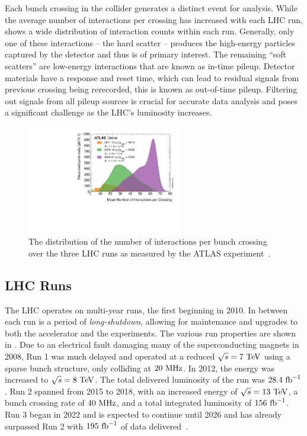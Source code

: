 Each bunch crossing in the collider generates a distinct event for analysis.
While the average number of interactions per crossing has increased with each LHC run,  shows a wide distribution of interaction counts within each run.
Generally, only one of these interactions -- the hard scatter -- produces the high-energy particles captured by the detector and thus is of primary interest.
The remaining ``soft scatters'' are low-energy interactions that are known as in-time pileup.
Detector materials have a response and reset time, which can lead to residual signals from previous crossing being rerecorded, this is known as out-of-time pileup.
Filtering out signals from all pileup sources is crucial for accurate data analysis and poses a significant challenge as the LHC's luminosity increases.

\begin{figure}
    \centering
    \includegraphics[width=0.6\textwidth]{Figures/cern_atlas/mu_run123.pdf}
    \caption{The distribution of the number of interactions per bunch crossing over the three LHC runs as measured by the ATLAS experiment~\cite{run3data}.}
    \label{fig:pileup}
\end{figure}

\subsection{LHC Runs}

The LHC operates on multi-year runs, the first beginning in 2010.
In between each run is a period of \textit{long-shutdown}, allowing for maintenance and upgrades to both the accelerator and the experiments.
The various run properties are shown in .
Due to an electrical fault damaging many of the superconducting magnets in 2008, Run 1 was much delayed and operated at a reduced $\sqrt{s}=7~\TeV$ using a sparse bunch structure, only colliding at $20~\MHz$.
In 2012, the energy was increased to $\sqrt{s}=8~\TeV$.
The total delivered luminosity of the run was $28.4~\ifb$.
Run 2 spanned from 2015 to 2018, with an increased energy of $\sqrt{s}=13~\TeV$, a bunch crossing rate of $40~\MHz$, and a total integrated luminosity of $156~\ifb$.
Run 3 began in 2022 and is expected to continue until 2026 and has already surpassed Run 2 with $195~\ifb$ of data delivered~\cite{run3data}.

